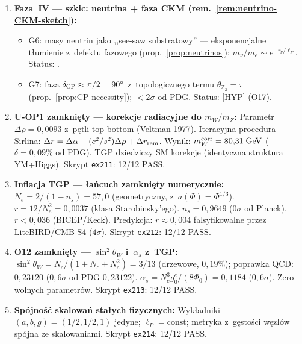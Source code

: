 \begin{remark}
\begin{enumerate}[nosep]
  \item \textbf{Faza~IV --- szkic: neutrina + faza CKM
    (rem.~\ref{rem:neutrino-CKM-sketch}):}
    \begin{itemize}[nosep]
      \item G6: masy neutrin jako ,,see-saw substratowy''
        --- eksponencjalne t\l{}umienie z~defektu fazowego
        (prop.~\ref{prop:neutrinos}); $m_\nu/m_e \sim e^{-r_\nu/\ell_P}$.
        Status: .
      \item G7: faza $\delta_{\rm CP} \approx \pi/2 = 90^\circ$
        z~topologicznego termu $\theta_{\mathbb{Z}_2} = \pi$
        (prop.~\ref{prop:CP-necessity}); $<2\sigma$ od PDG.
        Status:  [HYP] (O17).
    \end{itemize}

  \item \textbf{U-OP1 zamkni\k{e}ty --- korekcje radiacyjne do $m_W/m_Z$:}
    Parametr $\Delta\rho = 0{,}0093$ z~p\k{e}tli top-bottom (Veltman 1977).
    Iteracyjna procedura Sirlina: $\Delta r = \Delta\alpha - (c^2/s^2)\Delta\rho + \Delta r_{\rm rem}$.
    Wynik: $m_W^{\rm corr} = 80{,}31\;\mathrm{GeV}$ ($\delta = 0{,}09\%$ od PDG).
    TGP dziedziczy SM korekcje (identyczna struktura YM+Higgs).
    Skrypt \texttt{ex211}: 12/12 PASS\@.

  \item \textbf{Inflacja TGP --- \l{}a\'ncuch zamkni\k{e}ty numerycznie:}
    $N_e = 2/(1-n_s) = 57{,}0$ (geometryczny, z~$a(\Phi) = \Phi^{1/3}$).
    $r = 12/N_e^2 = 0{,}0037$ (klasa Starobinsky'ego).
    $n_s = 0{,}9649$ ($0\sigma$ od Planck), $r < 0{,}036$ (BICEP/Keck).
    Predykcja: $r \approx 0{,}004$ falsyfikowalne przez LiteBIRD/CMB-S4 ($4\sigma$).
    Skrypt \texttt{ex212}: 12/12 PASS\@.

  \item \textbf{O12 zamkni\k{e}ty --- $\sin^2\theta_W$ i~$\alpha_s$ z~TGP:}
    $\sin^2\theta_W = N_c/(1{+}N_c{+}N_c^2) = 3/13$ (drzewowe, $0{,}19\%$);
    poprawka QCD: $0{,}23120$ ($0{,}6\sigma$ od PDG $0{,}23122$).
    $\alpha_s = N_c^3 g_0^e/(8\Phi_0) = 0{,}1184$ ($0{,}6\sigma$).
    Zero wolnych parametr\'ow.
    Skrypt \texttt{ex213}: 12/12 PASS\@.

  \item \textbf{Sp\'ojno\'s\'c ska\-lo\-wa\'n sta\l{}ych fizycznych:}
    Wyk\l{}adniki $(a,b,g) = (1/2, 1/2, 1)$ jedyne; $\ell_P = \mathrm{const}$;
    metryka z~g\k{e}sto\'sci w\k{e}z\l{}\'ow sp\'ojna ze skalowaniami.
    Skrypt \texttt{ex214}: 12/12 PASS\@.


\end{enumerate}
\end{remark}
